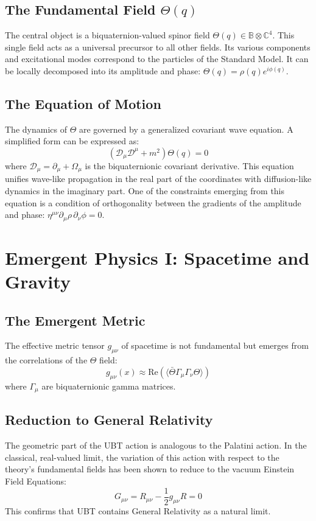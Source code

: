\documentclass[12pt, a4paper]{article}
\begin{document}
\subsection{The Fundamental Field \( \Theta(q) \)}
The central object is a biquaternion-valued spinor field \( \Theta(q) \in \mathbb{B} \otimes \mathbb{C}^4 \). This single field acts as a universal precursor to all other fields. Its various components and excitational modes correspond to the particles of the Standard Model. It can be locally decomposed into its amplitude and phase: \( \Theta(q) = \rho(q) e^{i\phi(q)} \).

\subsection{The Equation of Motion}
The dynamics of \( \Theta \) are governed by a generalized covariant wave equation. A simplified form can be expressed as:
\begin{equation}
    \left( \mathcal{D}_\mu \mathcal{D}^\mu + m^2 \right) \Theta(q) = 0
\end{equation}
where \( \mathcal{D}_\mu = \partial_\mu + \Omega_\mu \) is the biquaternionic covariant derivative. This equation unifies wave-like propagation in the real part of the coordinates with diffusion-like dynamics in the imaginary part. One of the constraints emerging from this equation is a condition of orthogonality between the gradients of the amplitude and phase: \( \eta^{\mu\nu} \partial_\mu \rho \, \partial_\nu \phi = 0 \).

\section{Emergent Physics I: Spacetime and Gravity}

\subsection{The Emergent Metric}
The effective metric tensor \( g_{\mu\nu} \) of spacetime is not fundamental but emerges from the correlations of the \( \Theta \) field:
\begin{equation}
g_{\mu\nu}(x) \approx \text{Re}(\langle \bar{\Theta} \Gamma_\mu \Gamma_\nu \Theta \rangle)
\end{equation}
where \( \Gamma_\mu \) are biquaternionic gamma matrices.

\subsection{Reduction to General Relativity}
The geometric part of the UBT action is analogous to the Palatini action. In the classical, real-valued limit, the variation of this action with respect to the theory's fundamental fields has been shown to reduce to the vacuum Einstein Field Equations:
\begin{equation}
G_{\mu\nu} = R_{\mu\nu} - \frac{1}{2} g_{\mu\nu} R = 0
\end{equation}
This confirms that UBT contains General Relativity as a natural limit.
\end{document}
